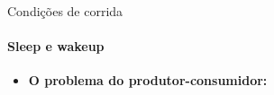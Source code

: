 \documentclass{beamer}
\begin{document}
\begin{frame}{Condições de corrida}
	\framesubtitle{Sleep e wakeup}
	\begin{itemize}
		\item \textbf{O problema do produtor-consumidor:}
		\begin{columns}
			\begin{column}{0.5\textwidth}
				\inputminted[fontsize=\footnotesize,lastline=14]{c}{resources/semaforo.c}
			\end{column}
			\begin{column}{0.5\textwidth}
				\inputminted[fontsize=\footnotesize,firstline=16]{c}{resources/semaforo.c}
			\end{column}
		\end{columns}
	\end{itemize}
\end{frame}
\end{document}
